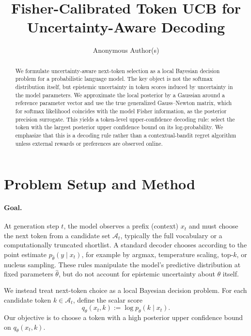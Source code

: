 \documentclass[11pt]{article}
\title{Fisher-Calibrated Token UCB for Uncertainty-Aware Decoding}
\author{Anonymous Author(s)}
\begin{document}
\maketitle

\begin{abstract}
We formulate uncertainty-aware next-token selection as a local Bayesian
decision problem for a probabilistic language model.
The key object is not the softmax distribution itself, but epistemic
uncertainty in token scores induced by uncertainty in the model parameters.
We approximate the local posterior by a Gaussian around a reference
parameter vector and use the true generalized Gauss--Newton matrix,
which for softmax likelihood coincides with the model Fisher information,
as the posterior precision surrogate.
This yields a token-level upper-confidence decoding rule:
select the token with the largest posterior upper confidence bound on
its log-probability.
We emphasize that this is a decoding rule rather than a contextual-bandit
regret algorithm unless external rewards or preferences are observed online.
\end{abstract}

\section{Problem Setup and Method}

\paragraph{Goal.}
At generation step $t$, the model observes a prefix (context) $x_t$
and must choose the next token from a candidate set $\mathcal{A}_t$,
typically the full vocabulary or a computationally truncated shortlist.
A standard decoder chooses according to the point estimate
$p_{\hat\theta}(y \mid x_t)$, for example by argmax, temperature scaling,
top-$k$, or nucleus sampling.
These rules manipulate the model's predictive distribution at fixed
parameters $\hat\theta$, but do not account for epistemic uncertainty
about $\theta$ itself.

We instead treat next-token choice as a local Bayesian decision problem.
For each candidate token $k \in \mathcal{A}_t$, define the scalar score
\[
q_\theta(x_t,k) := \log p_\theta(k \mid x_t).
\]
Our objective is to choose a token with a high posterior upper confidence
bound on $q_\theta(x_t,k)$.
\end{document}
